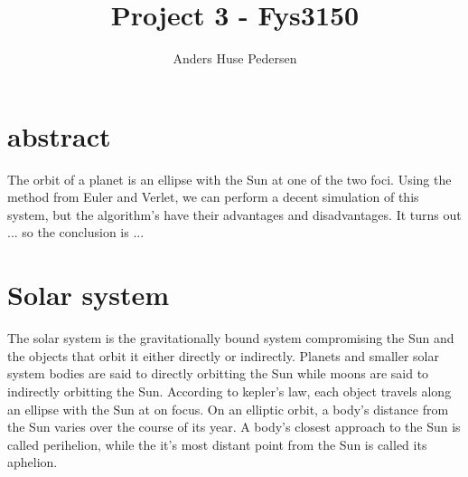 \documentclass{article}
\title{Project 3 - Fys3150}
\author{Anders Huse Pedersen}
\begin{document}
\section*{abstract}
The orbit of a planet is an ellipse with the Sun at one of the two foci. Using the method from Euler and Verlet, we can perform a decent simulation of this system, but the algorithm's have their advantages and disadvantages. It turns out ... so the conclusion is ...
\section{Solar system}
The solar system is the gravitationally bound system compromising the Sun and the objects that orbit it either directly or indirectly. Planets and smaller solar system bodies are said to directly orbitting the Sun while moons are said to indirectly orbitting the Sun.
According to kepler's law, each object travels along an ellipse with the Sun at on focus. On an elliptic orbit, a body's distance from the Sun varies over the course of its year. A body's closest approach to the Sun is called perihelion, while the it's most distant point from the Sun is called its aphelion.
\end{document}
